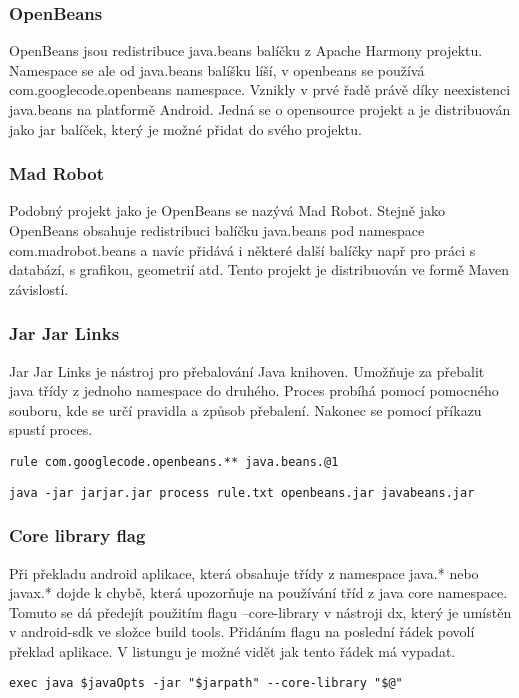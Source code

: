 \subsubsection{OpenBeans}
OpenBeans jsou redistribuce java.beans balíčku z Apache Harmony projektu. Namespace se ale od java.beans balíšku líší, v openbeans se používá com.googlecode.openbeans namespace. Vznikly v prvé řadě právě díky neexistenci java.beans na platformě Android. Jedná se o opensource projekt a je distribuován jako jar balíček, který je možné přidat do svého projektu. 

\subsubsection{Mad Robot}
Podobný projekt jako je OpenBeans se nazývá Mad Robot. Stejně jako OpenBeans obsahuje redistribuci balíčku java.beans pod namespace com.madrobot.beans a navíc přidává i některé další balíčky např pro práci s databází, s grafikou, geometrií atd. Tento projekt je distribuován ve formě Maven závislostí.

\subsubsection{Jar Jar Links}
Jar Jar Links je nástroj pro přebalování Java knihoven. Umožňuje za přebalit java třídy z jednoho namespace do druhého. Proces probíhá pomocí pomocného souboru, kde se určí pravidla a způsob přebalení. Nakonec se pomocí příkazu spustí proces.
\\
\begin{lstlisting}[captionpos={b},caption={Spanning tree broadcast algorithm.},frame={lines},label={rule},basicstyle=\footnotesize]
rule com.googlecode.openbeans.** java.beans.@1
\end{lstlisting}

\begin{lstlisting}[captionpos={b},caption={Spanning tree broadcast algorithm.},frame={lines},label={command},basicstyle=\footnotesize]
java -jar jarjar.jar process rule.txt openbeans.jar javabeans.jar
\end{lstlisting}

\subsubsection{Core library flag}
Při překladu android aplikace, která obsahuje třídy z namespace java.* nebo javax.* dojde k chybě, která upozorňuje na používání tříd z java core namespace. Tomuto se dá předejít použitím flagu --core-library v nástroji dx, který je umístěn v android-sdk ve složce build tools. Přidáním flagu na poslední řádek povolí překlad aplikace. V listungu je možné vidět jak tento řádek má vypadat.
\\
\begin{lstlisting}[captionpos={b},caption={Spanning tree broadcast algorithm.},frame={lines},label={command},basicstyle=\footnotesize]
exec java $javaOpts -jar "$jarpath" --core-library "$@"
\end{lstlisting}

